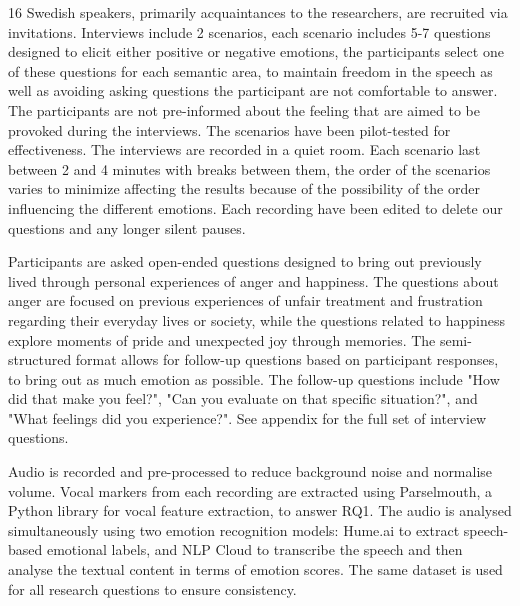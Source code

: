 16 Swedish speakers, primarily acquaintances to the researchers, are recruited via invitations. Interviews include 2 scenarios, 
each scenario includes 5-7 questions designed to elicit either positive or negative emotions, the participants select one of these questions for each semantic area, to maintain freedom in the speech as well as avoiding asking questions the participant are not comfortable to answer. The participants are not pre-informed about the feeling that are aimed to be provoked during the interviews. 
The scenarios have been pilot-tested for effectiveness. 
The interviews are recorded in a quiet room. Each scenario last between 2 and 4 minutes with breaks between them, the order of the scenarios varies to minimize affecting the results because of the possibility of the order influencing the different emotions. Each recording have been edited to delete our questions and any longer silent pauses. 

Participants are asked open-ended questions designed to bring out previously lived through personal experiences of anger and happiness. The questions about anger are focused on previous experiences of unfair treatment and frustration regarding their everyday lives or society, while the questions related to happiness explore moments of pride and unexpected joy through memories. 
The semi-structured format allows for follow-up questions based on participant responses, to bring out as much emotion as possible. The follow-up questions include "How did that make you feel?", "Can you evaluate on that specific situation?", and "What feelings did you experience?". See appendix for the full set of interview questions. 

Audio is recorded and pre-processed to reduce background noise and normalise volume. Vocal markers from each recording are extracted using Parselmouth, a Python library for vocal feature extraction, to answer RQ1. The audio is analysed simultaneously using two emotion recognition models: Hume.ai to extract speech-based emotional labels, and NLP Cloud to transcribe the speech and then analyse the textual content in terms of emotion scores. The same dataset is used for all research questions to ensure consistency. 

